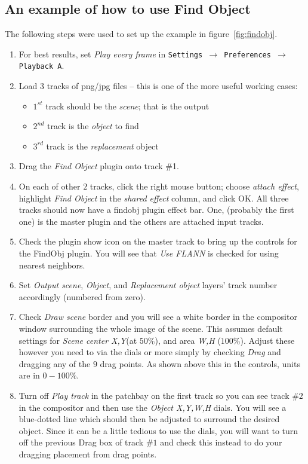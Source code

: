 \subsection{An example of how to use Find Object}%
\label{sub:example_how_use_findobj}

The following steps were used to set up the example in figure~\ref{fig:findobj}.

\begin{enumerate}
    \item For best results, set \textit{Play every frame} in \texttt{Settings $\rightarrow$ Preferences $\rightarrow$ Play\-back A}.
    \item Load 3 tracks of png/jpg files – this is one of the more useful working cases:
    \begin{itemize}
        \item $1^{st}$ track should be the \textit{scene}; that is the output
        \item $2^{nd}$ track is the \textit{object} to find
        \item $3^{rd}$ track is the \textit{replacement} object        
    \end{itemize}
    \item Drag the \textit{Find Object} plugin onto track \#1.
    \item On each of other $2$ tracks, click the right mouse button; choose \textit{attach effect}, highlight \textit{Find Object} in the \textit{shared effect} column, and click OK. All three tracks should now have a findobj plugin effect bar. One, (probably the first one) is the master plugin and the others are attached input tracks.
    \item Check the plugin show icon on the master track to bring up the controls for the FindObj plugin. You will see that \textit{Use FLANN} is checked for using nearest neighbors.
    \item Set \textit{Output scene}, \textit{Object}, and \textit{Replacement object} layers’ track number accordingly (numbered from zero).
    \item Check \textit{Draw scene} border and you will see a white border in the compositor window surrounding the whole image of the scene. This assumes default settings for \textit{Scene center X,Y}(at $50\%$), and area \textit{W,H} ($100\%$). Adjust these however you need to via the dials or more simply by checking \textit{Drag} and dragging any of the $9$ drag points. As shown above this in the controls, units are in $0-100\%$.
    \item Turn off \textit{Play track} in the patchbay on the first track so you can see track $\#2$ in the compositor and then use the \textit{Object X,Y,W,H} dials. You will see a blue-dotted line which should then be adjusted to surround the desired object. Since it can be a little tedious to use the dials, you will want to turn off the previous Drag box of track $\#1$ and check this instead to do your dragging placement from drag points.

\end{enumerate}

